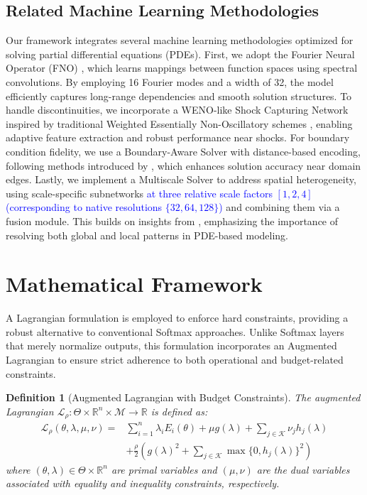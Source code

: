 \documentclass[preprint,12pt,authoryear]{elsarticle}
\newtheorem{definition}{Definition}
\begin{document}
\subsection{Related Machine Learning Methodologies}
\label{subsection:related_ml_methods}

Our framework integrates several machine learning methodologies optimized for solving partial differential equations (PDEs). First, we adopt the Fourier Neural Operator (FNO) \cite{li2021fourier}, which learns mappings between function spaces using spectral convolutions. By employing 16 Fourier modes and a width of 32, the model efficiently captures long-range dependencies and smooth solution structures. To handle discontinuities, we incorporate a WENO-like Shock Capturing Network inspired by traditional Weighted Essentially Non-Oscillatory schemes \cite{KOSSACZKA2021100201}, enabling adaptive feature extraction and robust performance near shocks. For boundary condition fidelity, we use a Boundary-Aware Solver with distance-based encoding, following methods introduced by \cite{Ripken2023MultiscaleNO}, which enhances solution accuracy near domain edges. Lastly, we implement a Multiscale Solver to address spatial heterogeneity, using scale-specific subnetworks \textcolor{blue}{at three relative scale factors $[1,2,4]$ (corresponding to native resolutions $\{32,64,128\}$)} and combining them via a fusion module. This builds on insights from \cite{inproceedings_mixed_boundary_conditions}, emphasizing the importance of resolving both global and local patterns in PDE-based modeling.



\section{Mathematical Framework}
\label{section:mathematical_framework}
A Lagrangian formulation is employed to enforce hard constraints, providing a robust alternative to conventional Softmax approaches. Unlike Softmax layers that merely normalize outputs, this formulation incorporates an Augmented Lagrangian to ensure strict adherence to both operational and budget-related constraints.

\begin{definition}[Augmented Lagrangian with Budget Constraints]
The augmented Lagrangian $\mathcal{L}_\rho: \Theta \times \mathbb{R}^n \times \mathcal{M} \to \mathbb{R}$ is defined as:
\begin{align}
    \label{equation:augmented_Lagrangian_formulation}
    \mathcal{L}_\rho(\theta, \lambda, \mu, \nu) = &\sum_{i=1}^n \lambda_i E_i(\theta) + \mu g(\lambda) + \sum_{j \in \mathcal{K}} \nu_j h_j(\lambda) \nonumber \\
    &+ \frac{\rho}{2} \left( g(\lambda)^2 + \sum_{j \in \mathcal{K}} \max\{0, h_j(\lambda)\}^2 \right)
\end{align}
where $(\theta, \lambda) \in \Theta \times \mathbb{R}^n$ are primal variables and $(\mu, \nu)$ are the dual variables associated with equality and inequality constraints, respectively.
\end{definition}
\end{document}
